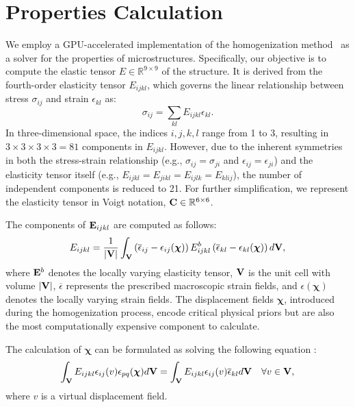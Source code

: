 \section{Properties Calculation}
\label{sec:homogen}
We employ a GPU-accelerated implementation of the homogenization method~\cite{andreassen2014Design, dong2018149} as a solver for the properties of microstructures.
Specifically, our objective is to compute the elastic tensor $E \in \mathbb{R}^{9\times9}$ of the structure.
It is derived from the fourth-order elasticity tensor $E_{ijkl}$, which governs the linear relationship between stress $\sigma_{ij}$ and strain $\epsilon_{kl}$ as:
\begin{equation}
    \sigma_{ij} = \sum_{kl}E_{ijkl}\epsilon_{kl}.
\end{equation}
In three-dimensional space, the indices $i, j, k, l$ range from 1 to 3, resulting in $3 \times 3 \times 3 \times 3 = 81$ components in $E_{ijkl}$. 
However, due to the inherent symmetries in both the stress-strain relationship (e.g., $\sigma_{ij} = \sigma_{ji}$ and $\epsilon_{ij} = \epsilon_{ji}$) and the elasticity tensor itself (e.g., $E_{ijkl} = E_{jikl} = E_{ijlk} = E_{klij}$), the number of independent components is reduced to 21. 
For further simplification, we represent the elasticity tensor in Voigt notation, $\mathbf{C} \in \mathbb{R}^{6\times6}$.

The components of $\mathbf{E}_{ijkl}$ are computed as follows:
\begin{equation}
\label{eq:E}
    E_{ijkl} = \frac{1}{|\mathbf{V}|} \int_{\mathbf{V}} \left( \overline{\epsilon}_{ij} - \epsilon_{ij}(\boldsymbol{\chi}) \right)  E^b_{ijkl} \left(\overline{\epsilon}_{kl} - \epsilon_{kl}(\boldsymbol{\chi}) \right) d\mathbf{V},
\end{equation}
where $\mathbf{E}^b$ denotes the locally varying elasticity tensor, $\mathbf{V}$ is the unit cell with volume $|\mathbf{V}|$, $\overline{\epsilon}$ represents the prescribed macroscopic strain fields, and $\epsilon(\boldsymbol{\chi})$ denotes the locally varying strain fields. 
The displacement fields $\boldsymbol{\chi}$, introduced during the homogenization process, encode critical physical priors but are also the most computationally expensive component to calculate.

The calculation of $\boldsymbol{\chi}$ can be formulated as solving the following equation :
\begin{equation}
\label{eq:chi_eq}
    \int_{\mathbf{V}} E_{ijkl} \epsilon_{ij}(v)\epsilon_{pq}(\boldsymbol{\chi}) d\mathbf{V} = \int_{\mathbf{V}} E_{ijkl} \epsilon_{ij}(v) \overline{\epsilon}_{kl} d\mathbf{V} \quad \forall v \in \mathbf{V},
\end{equation}
where $v$ is a virtual displacement field.

